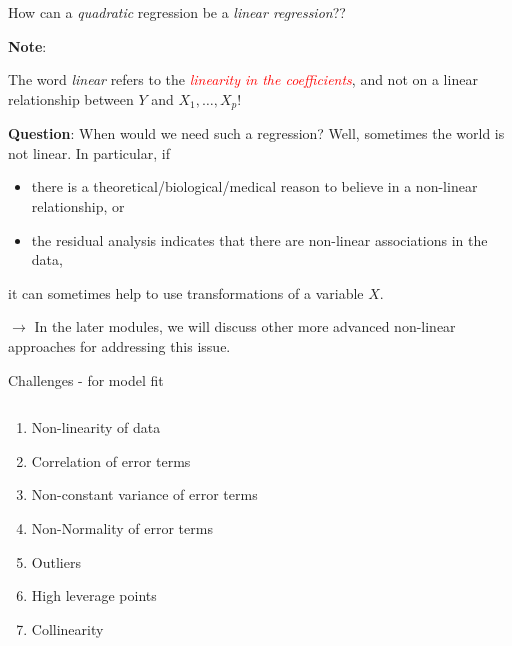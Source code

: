 \documentclass[10pt,ignorenonframetext,]{beamer}
\providecommand{\tightlist}{%
  \setlength{\itemsep}{0pt}\setlength{\parskip}{0pt}}
\begin{document}
\begin{frame}

How can a \emph{quadratic} regression be a \emph{linear regression}??

\vspace{4mm}

\textbf{Note}:

The word \emph{linear} refers to the
\emph{\textcolor{red}{linearity in the coefficients}}, and not on a
linear relationship between \(Y\) and \(X_1, \ldots , X_p\)!

\vspace{4mm}

\textbf{Question}: When would we need such a regression? Well, sometimes
the world is not linear. In particular, if

\begin{itemize}
\tightlist
\item
  there is a theoretical/biological/medical reason to believe in a
  non-linear relationship, or
\item
  the residual analysis indicates that there are non-linear associations
  in the data,
\end{itemize}

it can sometimes help to use transformations of a variable \(X\).

\vspace{2mm}

\scriptsize

\(\rightarrow\) In the later modules, we will discuss other more
advanced non-linear approaches for addressing this issue.

\end{frame}

\begin{frame}{Challenges - for model fit}
\protect\hypertarget{challenges---for-model-fit}{}

\(~\)

\begin{enumerate}
\tightlist
\item
  Non-linearity of data
\item
  Correlation of error terms
\item
  Non-constant variance of error terms
\item
  Non-Normality of error terms
\item
  Outliers
\item
  High leverage points
\item
  Collinearity
\end{enumerate}

\end{frame}
\end{document}

